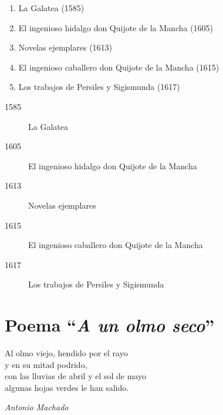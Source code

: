 \documentclass[a4paper, 12pt, twoside]{article} %
\begin{document}
\begin{enumerate}
  \item La Galatea (1585)
  \item El ingenioso hidalgo don Quijote de la Mancha (1605)
  \item Novelas ejemplares (1613)
  \item El ingenioso caballero don Quijote de la Mancha (1615)
  \item Los trabajos de Persiles y Sigismunda (1617)
\end{enumerate}

\begin{description}
  \item[1585] La Galatea 
  \item[1605] El ingenioso hidalgo don Quijote de la Mancha 
  \item[1613] Novelas ejemplares 
  \item[1615] El ingenioso caballero don Quijote de la Mancha 
  \item[1617] Los trabajos de Persiles y Sigismunda 
\end{description}
\section{Poema ``\emph{A un olmo seco}''}

\begin{flushleft}
Al olmo viejo, hendido por el rayo \\
y en su mitad podrido,\\
con las lluvias de abril y el sol de mayo\\
algunas hojas verdes le han salido.
\medskip

\emph{Antonio Machado}
\end{flushleft}
\end{document}
